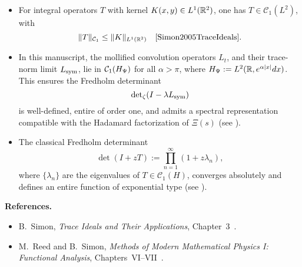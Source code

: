 \begin{definition}
\begin{itemize}
    \item For integral operators \( T \) with kernel \( K(x, y) \in L^1(\mathbb{R}^2) \), one has \( T \in \mathcal{C}_1(L^2) \), with
    \[
    \| T \|_{\mathcal{C}_1} \le \| K \|_{L^1(\R^2)} \quad \text{\cite[Thm.~4.2]{Simon2005TraceIdeals}}.
    \]

    \item In this manuscript, the mollified convolution operators \( L_t \), and their trace-norm limit \( L_{\mathrm{sym}} \), lie in \( \mathcal{C}_1(H_{\Psi}) \) for all \( \alpha > \pi \), where \( H_{\Psi} := L^2(\mathbb{R}, e^{\alpha |x|} dx) \). This ensures the Fredholm determinant
    \[
    \det\nolimits_{\zeta}(I - \lambda L_{\mathrm{sym}})
    \]
    is well-defined, entire of order one, and admits a spectral representation compatible with the Hadamard factorization of \( \Xi(s) \) (see ).

    \item The classical Fredholm determinant
    \[
    \det(I + zT) := \prod_{n=1}^\infty (1 + z \lambda_n),
    \]
    where \( \{ \lambda_n \} \) are the eigenvalues of \( T \in \mathcal{C}_1(H) \), converges absolutely and defines an entire function of exponential type (see ).
\end{itemize}

\medskip
\noindent\textbf{References.}
\begin{itemize}
    \item B.~Simon, \emph{Trace Ideals and Their Applications}, Chapter~3~\cite{Simon2005TraceIdeals}.
    \item M.~Reed and B.~Simon, \emph{Methods of Modern Mathematical Physics I: Functional Analysis}, Chapters~VI--VII~\cite{ReedSimon1980I}.
\end{itemize}
\end{definition}
